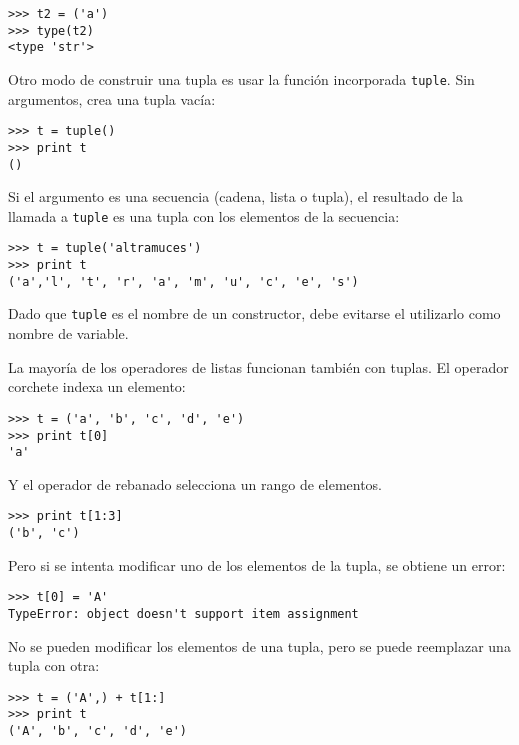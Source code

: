 \beforeverb
\begin{verbatim}
>>> t2 = ('a')
>>> type(t2)
<type 'str'>
\end{verbatim}
\afterverb
%
Otro modo de construir una tupla es usar la función incorporada {\tt tuple}.
Sin argumentos, crea una tupla vacía:


\beforeverb
\begin{verbatim}
>>> t = tuple()
>>> print t
()
\end{verbatim}
\afterverb
%
Si el argumento es una secuencia (cadena, lista o tupla), el resultado
de la llamada a {\tt tuple} es una tupla con los elementos de la secuencia:

\beforeverb
\begin{verbatim}
>>> t = tuple('altramuces')
>>> print t
('a','l', 't', 'r', 'a', 'm', 'u', 'c', 'e', 's')
\end{verbatim}
\afterverb
%
Dado que {\tt tuple} es el nombre de un constructor, debe evitarse
el utilizarlo como nombre de variable.

La mayoría de los operadores de listas funcionan también con tuplas. El operador corchete
indexa un elemento:


\beforeverb
\begin{verbatim}
>>> t = ('a', 'b', 'c', 'd', 'e')
>>> print t[0]
'a'
\end{verbatim}
\afterverb
%
Y el operador de rebanado selecciona un rango de elementos.


\beforeverb
\begin{verbatim}
>>> print t[1:3]
('b', 'c')
\end{verbatim}
\afterverb
%
Pero si se intenta modificar uno de los elementos de la tupla, se
obtiene un error:


\beforeverb
\begin{verbatim}
>>> t[0] = 'A'
TypeError: object doesn't support item assignment
\end{verbatim}
\afterverb
%
No se pueden modificar los elementos de una tupla, pero se puede
reemplazar una tupla con otra:

\beforeverb
\begin{verbatim}
>>> t = ('A',) + t[1:]
>>> print t
('A', 'b', 'c', 'd', 'e')
\end{verbatim}
\afterverb
%

